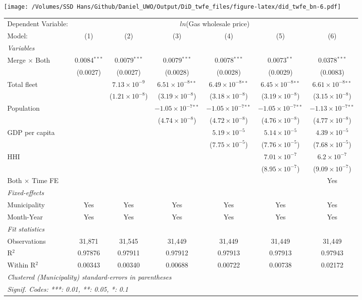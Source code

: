 \documentclass[
]{article}
\begin{document}
\texttt{[image: /Volumes/SSD Hans/Github/Daniel\_UWO/Output/DiD\_twfe\_files/figure-latex/did\_twfe\_bn-6.pdf]}

\begin{tabular}{lcccccc}
\tabularnewline\midrule\midrule
Dependent Variable:&\multicolumn{6}{c}{$ln$(Gas wholesale price)}\\
Model:&(1) & (2) & (3) & (4) & (5) & (6)\\
\midrule \emph{Variables}&   &   &   &   &   &  \\
Merge $\times $ Both & 0.0084$^{***}$ & 0.0079$^{***}$ & 0.0079$^{***}$ & 0.0078$^{***}$ & 0.0073$^{**}$ & 0.0378$^{***}$\\
  &(0.0027) & (0.0027) & (0.0028) & (0.0028) & (0.0029) & (0.0083)\\
Total fleet &    & $7.13\times 10^{-9}$ & $6.51\times 10^{-8}$$^{**}$ & $6.49\times 10^{-8}$$^{**}$ & $6.45\times 10^{-8}$$^{**}$ & $6.61\times 10^{-8}$$^{**}$\\
  &   & ($1.21\times 10^{-8}$) & ($3.19\times 10^{-8}$) & ($3.18\times 10^{-8}$) & ($3.19\times 10^{-8}$) & ($3.15\times 10^{-8}$)\\
Population &    &    & $-1.05\times 10^{-7}$$^{**}$ & $-1.05\times 10^{-7}$$^{**}$ & $-1.05\times 10^{-7}$$^{**}$ & $-1.13\times 10^{-7}$$^{**}$\\
  &   &    & ($4.74\times 10^{-8}$) & ($4.72\times 10^{-8}$) & ($4.76\times 10^{-8}$) & ($4.77\times 10^{-8}$)\\
GDP per capita &    &    &    & $5.19\times 10^{-5}$ & $5.14\times 10^{-5}$ & $4.39\times 10^{-5}$\\
  &   &    &    & ($7.75\times 10^{-5}$) & ($7.76\times 10^{-5}$) & ($7.68\times 10^{-5}$)\\
HHI &    &    &    &    & $7.01\times 10^{-7}$ & $6.2\times 10^{-7}$\\
  &   &    &    &    & ($8.95\times 10^{-7}$) & ($9.09\times 10^{-7}$)\\
Both $\times$ Time FE &  &  &  &  &  & Yes\\
\midrule \emph{Fixed-effects}&   &   &   &   &   &  \\
Municipality & Yes & Yes & Yes & Yes & Yes & Yes\\
Month-Year & Yes & Yes & Yes & Yes & Yes & Yes\\
\midrule \emph{Fit statistics}&  & & & & & \\
Observations & 31,871&31,545&31,449&31,449&31,449&31,449\\
R$^2$ & 0.97876&0.97911&0.97912&0.97913&0.97913&0.97943\\
Within R$^2$ & 0.00343&0.00340&0.00688&0.00722&0.00738&0.02172\\
\midrule\midrule\multicolumn{7}{l}{\emph{Clustered (Municipality) standard-errors in parentheses}}\\
\multicolumn{7}{l}{\emph{Signif. Codes: ***: 0.01, **: 0.05, *: 0.1}}\\
\end{tabular}
\end{document}
